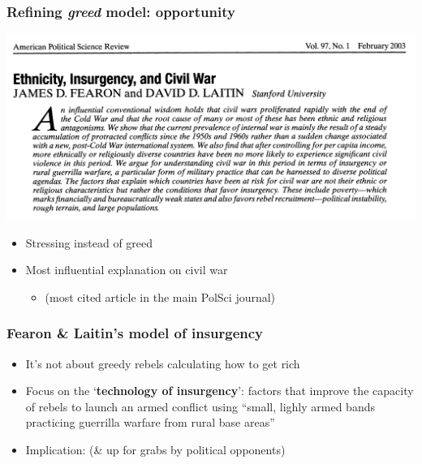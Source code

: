 \documentclass[aspectratio=43]{beamer}
\begin{document}
\begin{frame}
\frametitle{Refining \textit{greed} model: opportunity}
\centering

\includegraphics[width = \textwidth]{img/fearon_laitin}

\begin{itemize}
  \item Stressing  instead of greed
  \item Most influential explanation on civil war
  \begin{itemize}
    \item[] (most cited article in the main PolSci journal)
  \end{itemize}
\end{itemize}

\end{frame}

\begin{frame}
\frametitle{Fearon \& Laitin's model of insurgency}
\centering

\begin{itemize}
  \item It's not about greedy rebels calculating how to get rich
  \item Focus on the `\textbf{technology of insurgency}': factors that improve the capacity of rebels to launch an armed conflict using ``small, lighly armed bands practicing guerrilla warfare from rural base areas''
  \item<2-> Implication:  (\& up for grabs by political opponents)
\end{itemize}

\end{frame}
\end{document}
